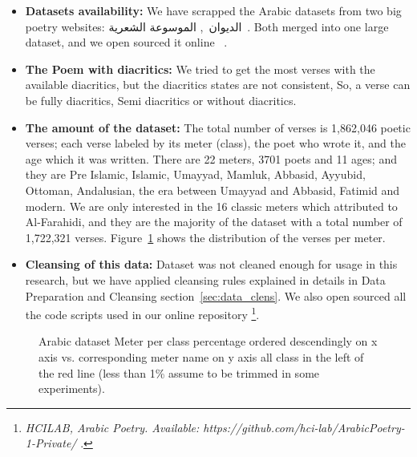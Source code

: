 \begin{itemize}

  \item \textbf{Datasets availability:} We have scrapped the Arabic datasets from two big poetry websites: \textarabic{الديوان}~\cite{diwan}, \textarabic{الموسوعة الشعرية}~\cite{PoetryEncyclopedia2016}. Both merged into one large dataset, and we open sourced it online ~\cite{ArabicpoetryDS}.

  \item \textbf{The Poem with diacritics:} We tried to get the most verses with the available diacritics, but the diacritics states are not consistent, So, a verse can be fully diacritics, Semi diacritics or without diacritics.

\item \textbf{The amount of the dataset:} The total number of verses is 1,862,046 poetic verses; each verse labeled by its meter (class), the poet who wrote it, and the age which it was written. There are 22 meters, 3701 poets and 11 ages; and they are Pre Islamic, Islamic, Umayyad, Mamluk, Abbasid, Ayyubid, Ottoman, Andalusian, the era between Umayyad and Abbasid, Fatimid and modern. We are only interested in the 16 classic meters which attributed to Al-Farahidi, and they are the majority of the dataset with a total number of 1,722,321 verses. Figure~\ref{fig:data_size_distribution} shows the distribution of the verses per meter. %
  
\item \textbf{Cleansing of this data:} Dataset was not cleaned enough for usage in this research, but we have applied cleansing rules explained in details in Data Preparation and Cleansing section~\ref{sec:data_clens}. We also open sourced all the code scripts used in our online repository \footnote{\textit{HCILAB, Arabic Poetry. Available: https://github.com/hci-lab/ArabicPoetry-1-Private/ }.}.
\end{itemize}

\begin{figure}
	\centering
	\begin{tikzpicture}[scale=1.2]
	
	\end{tikzpicture}%
	\caption{Arabic dataset Meter per class percentage ordered descendingly on x axis vs. corresponding meter name on y axis all class in the left of the red line (less than 1\% assume to be trimmed in some experiments).	}\label{fig:data_size_distribution}
\end{figure}


